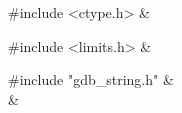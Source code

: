 \medskip
\begin{cxreftabi}
{\stt \#include <ctype.h>} &\\
\end{cxreftabi}

\medskip
\begin{cxreftabi}
{\stt \#include <limits.h>} &\\
\end{cxreftabi}

\medskip
\begin{cxreftabi}
{\stt \#include "gdb\_string.h"} &\\
\hspace*{0.2in}{\stt \#include <string.h>} &\\
\end{cxreftabi}

\medskip

